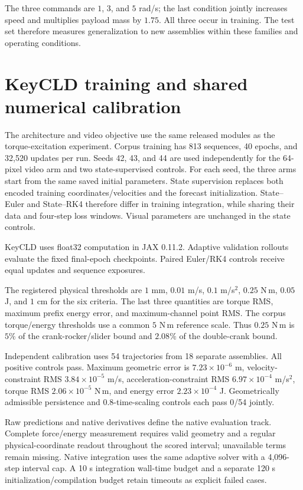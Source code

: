 The three commands are $1$, $3$, and $5$ rad/s; the last condition jointly increases speed and multiplies payload mass by $1.75$. All three occur in training. The test set therefore measures generalization to new assemblies within these families and operating conditions.

\section{KeyCLD training and shared numerical calibration}
The architecture and video objective use the same released modules as the torque-excitation experiment. Corpus training has 813 sequences, 40 epochs, and 32,520 updates per run. Seeds 42, 43, and 44 are used independently for the 64-pixel video arm and two state-supervised controls. For each seed, the three arms start from the same saved initial parameters. State supervision replaces both encoded training coordinates/velocities and the forecast initialization. State--Euler and State--RK4 therefore differ in training integration, while sharing their data and four-step loss windows. Visual parameters are unchanged in the state controls.

KeyCLD uses float32 computation in JAX 0.11.2. Adaptive validation rollouts evaluate the fixed final-epoch checkpoints. Paired Euler/RK4 controls receive equal updates and sequence exposures.

The registered physical thresholds are $1$ mm, $0.01$ m/s, $0.1$ m/s$^2$, $0.25$ N\,m, $0.05$ J, and $1$ cm for the six criteria. The last three quantities are torque RMS, maximum prefix energy error, and maximum-channel point RMS. The corpus torque/energy thresholds use a common $5$ N\,m reference scale. Thus $0.25$ N\,m is $5\%$ of the crank-rocker/slider bound and $2.08\%$ of the double-crank bound.

Independent calibration uses 54 trajectories from 18 separate assemblies. All positive controls pass. Maximum geometric error is $7.23\times10^{-6}$ m, velocity-constraint RMS $3.84\times10^{-5}$ m/s, acceleration-constraint RMS $6.97\times10^{-4}$ m/s$^2$, torque RMS $2.06\times10^{-5}$ N\,m, and energy error $2.23\times10^{-4}$ J. Geometrically admissible persistence and $0.8$-time-scaling controls each pass 0/54 jointly.

Raw predictions and native derivatives define the native evaluation track. Complete force/energy measurement requires valid geometry and a regular physical-coordinate readout throughout the scored interval; unavailable terms remain missing. Native integration uses the same adaptive solver with a 4,096-step interval cap. A 10 s integration wall-time budget and a separate 120 s initialization/compilation budget retain timeouts as explicit failed cases.

